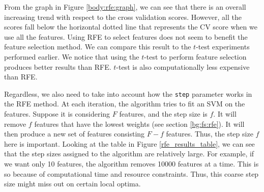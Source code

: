 \documentclass[12pt, twoside, a4paper]{report}
\begin{document}

From the graph in Figure \ref{body:rfe:graph}, we can see that there is an overall increasing trend with respect to the cross validation scores. However, all the scores fall below the horizontal dotted line that represents the CV score when we use all the features. Using RFE to select features does not seem to benefit the feature selection method. We can compare this result to the $t$-test experiments performed earlier. We notice that using the $t$-test to perform feature selection produces better results than RFE. $t$-test is also computationally less expensive than RFE.

Regardless, we also need to take into account how the \texttt{step} parameter works in the RFE method. At each iteration, the algorithm tries to fit an SVM on the features. Suppose it is considering $F$ features, and the step size is $f$. It will remove $f$ features that have the lowest weights (see section \ref{bg:fs:rfe}). It will then produce a new set of features consisting $F-f$ features. Thus, the step size $f$ here is important. Looking at the table in Figure \ref{rfe_results_table}, we can see that the step sizes assigned to the algorithm are relatively large. For example, if we want only 10 features, the algorithm removes 10000 features at a time. This is so because of computational time and resource constraints. Thus, this coarse step size might miss out on certain local optima.
\end{document}
